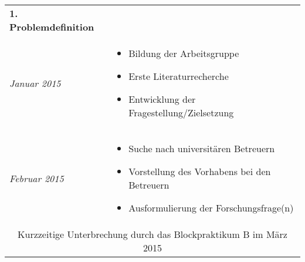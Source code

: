 \begin{longtable}{l|p{9.8cm}}
	
	\textbf{1. Problemdefinition} & \\
	\emph{Januar 2015} &
	\vspace*{-0.6cm}
	\begin{itemize}[nosep,topsep=-0.6cm]
		\item Bildung der Arbeitsgruppe
		\item Erste Literaturrecherche
		\item Entwicklung der Fragestellung/Zielsetzung
	\end{itemize} \\* 
	
	\emph{Februar 2015} & 
	\vspace*{-0.6cm}
	\begin{itemize}[nosep,topsep=-0.6cm]
		\item Suche nach universitären Betreuern
		\item Vorstellung des Vorhabens bei den Betreuern
		\item Ausformulierung der Forschungsfrage(n)
	\end{itemize} \\
	
	\multicolumn{2}{c}{Kurzzeitige Unterbrechung durch das Blockpraktikum B im März 2015} \\*
	

\end{longtable}
